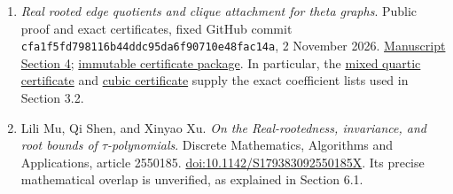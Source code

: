 \documentclass[
  11pt,
  a4paper,
]{article}
\begin{document}
\begin{enumerate}
\begin{samepage}
  \end{samepage}
\item
  \emph{Real rooted edge quotients and clique attachment for theta
  graphs}. Public proof and exact certificates, fixed GitHub commit
  \texttt{\nolinkurl{cfa1f5fd798116b44ddc95da6f90710e48fac14a}}, 2
  November 2026.
  \href{https://github.com/Aurantium-47/brw-tau-clique-attachments/blob/cfa1f5fd798116b44ddc95da6f90710e48fac14a/extensions/2026-11-02-all-theta/MANUSCRIPT.md\#4-exact-factor-repair-in-the-radius-disk}{Manuscript
  Section 4};
  \href{https://github.com/Aurantium-47/brw-tau-clique-attachments/tree/cfa1f5fd798116b44ddc95da6f90710e48fac14a/extensions/2026-11-02-all-theta}{immutable
  certificate package}. In particular, the
  \href{https://github.com/Aurantium-47/brw-tau-clique-attachments/blob/cfa1f5fd798116b44ddc95da6f90710e48fac14a/extensions/2026-11-02-all-theta/effective_mixed_certificate.json}{mixed
  quartic certificate} and
  \href{https://github.com/Aurantium-47/brw-tau-clique-attachments/blob/cfa1f5fd798116b44ddc95da6f90710e48fac14a/extensions/2026-11-02-all-theta/effective_cubic_certificate.json}{cubic
  certificate} supply the exact coefficient lists used in Section 3.2.
\item
  Lili Mu, Qi Shen, and Xinyao Xu. \emph{On the Real-rootedness,
  invariance, and root bounds of \(\tau\)-polynomials}. Discrete
  Mathematics, Algorithms and Applications, article 2550185.
  \href{https://doi.org/10.1142/S179383092550185X}{doi:10.1142/S179383092550185X}.
  Its precise mathematical overlap is unverified, as explained in
  Section 6.1.
\end{enumerate}
\end{document}
